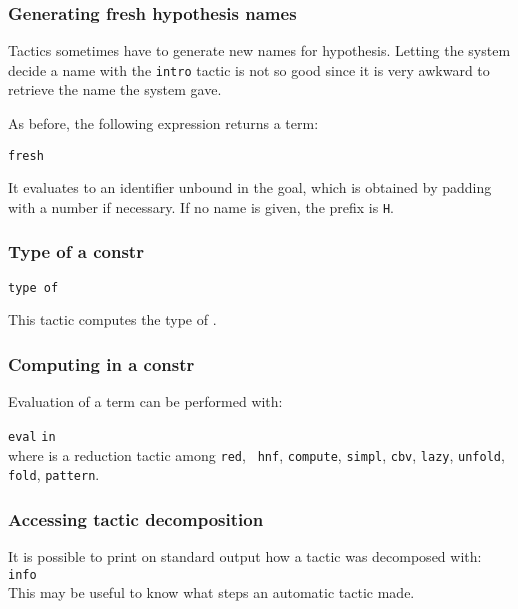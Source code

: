 

\subsubsection{Generating fresh hypothesis names}

Tactics sometimes have to generate new names for hypothesis. Letting
the system decide a name with the {\tt intro} tactic is not so good
since it is very awkward to retrieve the name the system gave.

As before, the following expression returns a term:

{\tt fresh} {\qstring}

It evaluates to an identifier unbound in the goal, which is obtained
by padding {\qstring} with a number if necessary. If no name is given,
the prefix is {\tt H}.

\subsubsection{Type of a constr}

{\tt type of} {\term}

This tactic computes the type of {\term}.


\subsubsection{Computing in a constr}

Evaluation of a term can be performed with:

{\tt eval} {} {\tt in} {\term}\\

where  is a reduction tactic among {\tt red}, {\tt
hnf}, {\tt compute}, {\tt simpl}, {\tt cbv}, {\tt lazy}, {\tt unfold},
{\tt fold}, {\tt pattern}.


\subsubsection{Accessing tactic decomposition}

It is possible to print on standard output how a tactic was
decomposed with:\\

{\tt info} {\tacexpr}\\

This may be useful to know what steps an automatic tactic made.


